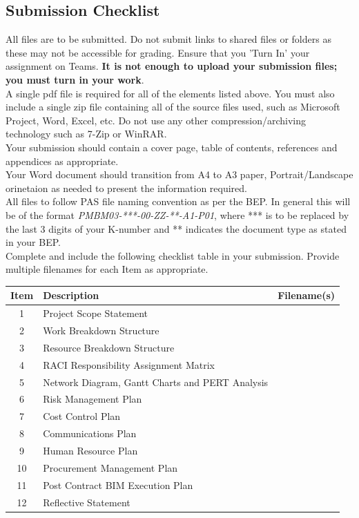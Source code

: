 \newpage
\subsection*{Submission Checklist}

All files are to be submitted.  Do not submit links to shared files or folders as these may not be accessible for grading.  Ensure that you 'Turn In' your assignment on Teams.  \textbf{It is not enough to upload your submission files; you must turn in your work}.\\

A single pdf file is required for all of the elements listed above.  You must also include a single zip file containing all of the source files used, such as Microsoft Project, Word, Excel, etc.  Do not use any other compression/archiving technology such as 7-Zip or WinRAR.\\

Your submission should contain a cover page, table of contents, references and appendices as appropriate.\\

Your Word document should transition from A4 to A3 paper, Portrait/Landscape orinetaion as needed to present the information required.\\

All files to follow PAS file naming convention as per the BEP.  In general this will be of the format \textit{PMBM03-***-00-ZZ-**-A1-P01}, where *** is to be replaced by the last 3 digits of your K-number and ** indicates the document type as stated in your BEP.\\

Complete and include the following checklist table in your submission.  Provide multiple filenames for each Item as appropriate. \\


\begin{tabularx}{\textwidth}{ |c|X|l| }
	\hline
	\textbf{Item} & \textbf{Description} & \textbf{Filename(s)} \\
	\hline
	\hline
	1  & Project Scope Statement & \\
	\hline
	2  & Work Breakdown Structure & \\
	\hline
	3  & Resource Breakdown Structure & \\
	\hline
	4  & RACI Responsibility Assignment Matrix &  \\
	\hline
	5  & Network Diagram, Gantt Charts and PERT Analysis &  \\
	\hline
	6  & Risk Management Plan & \\
	\hline
	7  & Cost Control Plan &  \\
	\hline
	8  & Communications Plan & \\
	\hline
	9  & Human Resource Plan &  \\
	\hline
	10  & Procurement Management Plan & \\
	\hline
	11  & Post Contract BIM Execution Plan &   \\
	\hline
	12  & Reflective Statement & \\
	\hline
\end{tabularx}

